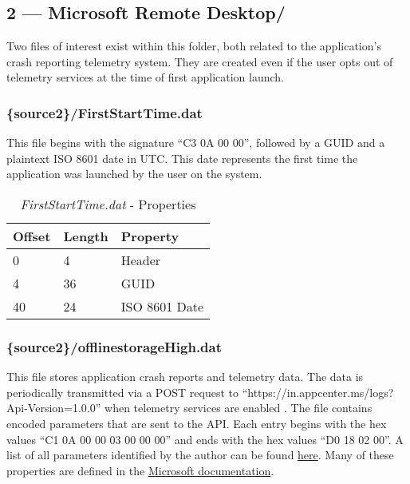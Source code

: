 \documentclass[journal]{IEEEtran}
\begin{document}
\subsection{2 — Microsoft Remote Desktop/}

Two files of interest exist within this folder, both related to the application’s crash reporting telemetry system. They are created even if the user opts out of telemetry services at the time of first application launch.\\

\subsubsection{\{source2\}/FirstStartTime.dat}

This file begins with the signature “C3 0A 00 00”, followed by a GUID and a plaintext ISO 8601\cite{noauthor_iso_nodate} date in UTC. This date represents the first time the application was launched by the user on the system.

\begin{table}[h!]
\caption{\textit{FirstStartTime.dat} - Properties}
\begin{center}
\begin{tabular}{lll}
Offset & Length & Property      \\ \hline
0      & 4      & Header        \\
4      & 36     & GUID          \\
40     & 24     & ISO 8601 Date
\end{tabular}
\end{center}
\end{table}

\noindent
\subsubsection{\{source2\}/offlinestorageHigh.dat}

This file stores application crash reports and telemetry data. The data is periodically transmitted via a POST request to “https://in.appcenter.ms/logs?Api-Version=1.0.0” when telemetry services are enabled \cite{king-of-spades_upload_nodate} \cite{king-of-spades_app_nodate}. The file contains encoded parameters that are sent to the API. Each entry begins with the hex values “C1 0A 00 00 03 00 00 00” and ends with the hex values “D0 18 02 00”. A list of all parameters identified by the author can be found \href{https://jholtmann.github.io/mrdpf/\#mrdpf.parser\_definitions.OFFLINE\_STORAGE\_PARAMETERS'}{here}. Many of these properties are defined in the \href{https://docs.microsoft.com/en-us/deployoffice/privacy/required-diagnostic-data}{Microsoft documentation}.\\
\end{document}
